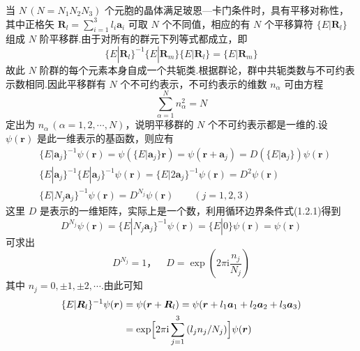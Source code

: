 当 $N\,(N=N_1N_2N_3)$ 个元胞的晶体满足玻恩—卡门条件时，具有平移对称性，其中正格矢 $\boldsymbol{R}_l=\sum_{i=1}^{3}l_i\boldsymbol{a}_i$ 可取 $N$ 个不同值，相应的有 $N$ 个平移算符 $\{E|\boldsymbol{R}_l\}$ 组成 $N$ 阶平移群.由于对所有的群元下列等式都成立，即
\begin{equation}
  \{E|\boldsymbol{R}_l\}^{-1}\{E|\boldsymbol{R}_m\}\{E|\boldsymbol{R}_l\}
  =\{E|\boldsymbol{R}_m\}
\end{equation}
故此 $N$ 阶群的每个元素本身自成一个共轭类.根据群论，群中共轭类数与不可约表示数相同.因此平移群有 $N$ 个不可约表示，不可约表示的维数 $n_\alpha$ 可由方程
\begin{equation}
  \sum_{\alpha=1}^{N}n_\alpha^2=N
\end{equation}
定出为 $n_\alpha\,(\alpha=1,2,\cdots,N)$，说明平移群的 $N$ 个不可约表示都是一维的.设 $\psi(\boldsymbol{r})$ 是此一维表示的基函数，则应有
\begin{equation}
\begin{aligned}
  &\{E|\boldsymbol{a}_j\}^{-1}\psi(\boldsymbol{r})
  =\psi(\{E|\boldsymbol{a}_j\}\boldsymbol{r})
  =\psi(\boldsymbol{r}+\boldsymbol{a}_j)
  =D(\{E|\boldsymbol{a}_j\})\psi(\boldsymbol{r})\\
  &\{E|\boldsymbol{a}_j\}^{-1}\{E|\boldsymbol{a}_j\}^{-1}\psi(\boldsymbol{r})
  =\{E|2\boldsymbol{a}_j\}^{-1}\psi(\boldsymbol{r})=D^2\psi(\boldsymbol{r})\\
  &\{E|N_j\boldsymbol{a}_j\}^{-1}\psi(\boldsymbol{r})
  =D^{N_j}\psi(\boldsymbol{r})\qquad(j=1,2,3)
\end{aligned}
\end{equation}
这里 $D$ 是表示的一维矩阵，实际上是一个数，利用循环边界条件式(1.2.1)得到
\begin{equation}
  D^{N_j}\psi(\boldsymbol{r})=\{E|N_j\boldsymbol{a}_j\}^{-1}\psi(\boldsymbol{r})
  =\{E|0\}\psi(\boldsymbol{r})=\psi(\boldsymbol{r})
\end{equation}
可求出
\begin{equation}
  D^{N_j}=1\text{，}\quad D=\exp\left(2\pi\mathrm{i}\frac{n_j}{N_j}\right)
\end{equation}
其中 $n_j=0,\pm1,\pm2,\cdots$.由此可知
\begin{equation}
\begin{aligned}
  \{E|\boldsymbol{R}_l\}^{-1}\psi(\boldsymbol{r})
  &=\psi(\boldsymbol{r}+\boldsymbol{R}_l)
  =\psi(\boldsymbol{r}+l_1\boldsymbol{a}_1+l_2\boldsymbol{a}_2+l_3\boldsymbol{a}_3)\\
  &=\exp\Bigl[2\pi\mathrm{i}\sum_{j=1}^{3}\left(l_jn_j/N_j\right)\Bigr]\psi(\boldsymbol{r})
\end{aligned}
\end{equation}
